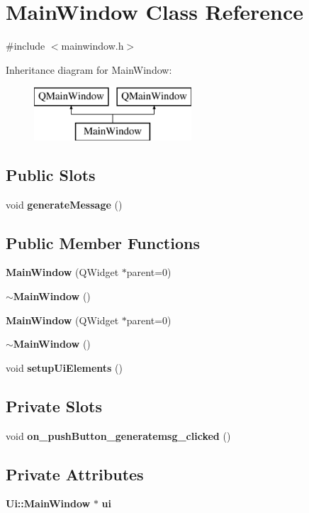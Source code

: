 \section{Main\+Window Class Reference}
\label{class_main_window}


{\ttfamily \#include $<$mainwindow.\+h$>$}

Inheritance diagram for Main\+Window\+:\begin{figure}[H]
\begin{center}
\leavevmode
\includegraphics[height=2.000000cm]{d9/dc6/class_main_window}
\end{center}
\end{figure}
\subsection*{Public Slots}
\begin{DoxyCompactItemize}
\item 
void \textbf{ generate\+Message} ()
\end{DoxyCompactItemize}
\subsection*{Public Member Functions}
\begin{DoxyCompactItemize}
\item 
\textbf{ Main\+Window} (Q\+Widget $\ast$parent=0)
\item 
\textbf{ $\sim$\+Main\+Window} ()
\item 
\textbf{ Main\+Window} (Q\+Widget $\ast$parent=0)
\item 
\textbf{ $\sim$\+Main\+Window} ()
\item 
void \textbf{ setup\+Ui\+Elements} ()
\end{DoxyCompactItemize}
\subsection*{Private Slots}
\begin{DoxyCompactItemize}
\item 
void \textbf{ on\+\_\+push\+Button\+\_\+generatemsg\+\_\+clicked} ()
\end{DoxyCompactItemize}
\subsection*{Private Attributes}
\begin{DoxyCompactItemize}
\item 
\textbf{ Ui\+::\+Main\+Window} $\ast$ \textbf{ ui}
\end{DoxyCompactItemize}


